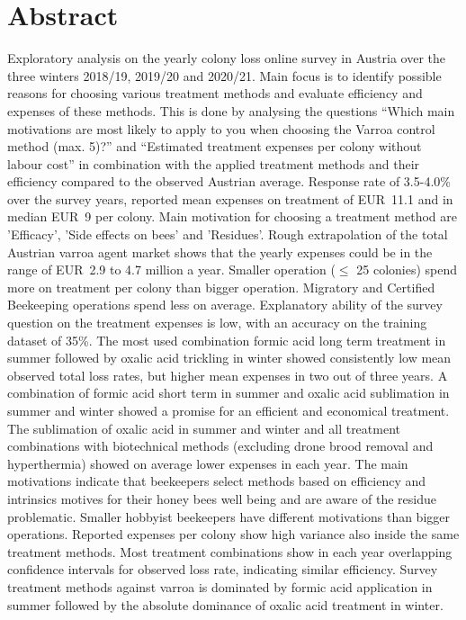 \chapter*{Abstract}
\label{sec:abstract}
\vspace*{-10mm}

Exploratory analysis on the yearly colony loss online survey in Austria over the three winters 2018/19, 2019/20 and 2020/21. Main focus is to identify possible reasons for choosing various treatment methods and evaluate efficiency and expenses of these methods. This is done by analysing the questions \enquote{Which main motivations are most likely to apply to you when choosing the Varroa control method (max. 5)?} and \enquote{Estimated treatment expenses per colony without labour cost} in combination with the applied treatment methods and their efficiency compared to the observed Austrian average. Response rate of 3.5-4.0\% over the survey years, reported mean expenses on treatment of EUR~11.1 and in median EUR~9 per colony. Main motivation for choosing a treatment method are 'Efficacy', 'Side effects on bees' and 'Residues'. Rough extrapolation of the total Austrian varroa agent market shows that the yearly expenses could be in the range of EUR~2.9 to 4.7 million a year. Smaller operation ($\leq$ 25 colonies) spend more on treatment per colony than bigger operation. Migratory and Certified Beekeeping operations spend less on average. Explanatory ability of the survey question on the treatment expenses is low, with an accuracy on the training dataset of 35\%. The most used combination formic acid long term treatment in summer followed by oxalic acid trickling in winter showed consistently low mean observed total loss rates, but higher mean expenses in two out of three years. A combination of formic acid short term in summer and oxalic acid sublimation in summer and winter showed a promise for an efficient and economical treatment. The sublimation of oxalic acid in summer and winter and all treatment combinations with biotechnical methods (excluding drone brood removal and hyperthermia) showed on average lower expenses in each year. The main motivations indicate that beekeepers select methods based on efficiency and intrinsics motives for their honey bees well being and are aware of the residue problematic. Smaller hobbyist beekeepers have different motivations than bigger operations. Reported expenses per colony show high variance also inside the same treatment methods. Most treatment combinations show in each year overlapping confidence intervals for observed loss rate, indicating similar efficiency. Survey treatment methods against varroa is dominated by formic acid application in summer followed by the absolute dominance of oxalic acid treatment in winter.
